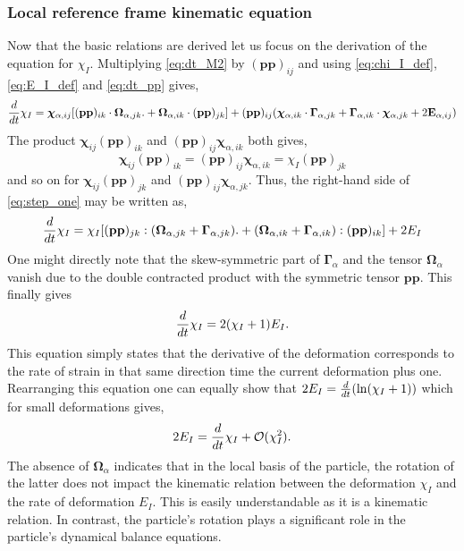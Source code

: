 \subsubsection{Local reference frame kinematic equation}

Now that the basic relations are derived let us focus on the derivation of the equation for $\chi_I$. 
Multiplying \ref{eq:dt_M2} by $(\textbf{pp})_{ij}$ and using \ref{eq:chi_I_def},\ref{eq:E_I_def} and  \ref{eq:dt_pp} gives, 
\begin{equation}
    \ddt \chi_I
    = 
    \bm\chi_{\alpha,ij} [(\textbf{pp})_{ik}\cdot\bm\Omega_{\alpha,jk}. 
    +\bm\Omega_{\alpha,ik}\cdot (\textbf{pp})_{jk}]
    + (\textbf{pp})_{ij}(\bm\chi_{\alpha,ik} \cdot \bm\Gamma_{\alpha,jk}
    + \bm\Gamma_{\alpha,ik} \cdot \bm\chi_{\alpha,jk}
    + 2\textbf{E}_{\alpha,ij})
    \label{eq:step_one}
\end{equation}
The product $\bm\chi_{ij} (\textbf{pp})_{ik}$ and $(\textbf{pp})_{ij}\bm\chi_{\alpha,ik}$ both gives, 
\begin{equation*}
    \bm\chi_{ij} (\textbf{pp})_{ik}
    =
    (\textbf{pp})_{ij}\bm\chi_{\alpha,ik}
    = 
    \chi_I (\textbf{pp})_{jk}
\end{equation*}
and so on for $\bm\chi_{ij} (\textbf{pp})_{jk}$ and $(\textbf{pp})_{ij} \bm\chi_{\alpha,jk}$. 
Thus, the right-hand side of \ref{eq:step_one} may be written as, 
\begin{equation}
    \ddt \chi_I
    = 
    \chi_I [(\textbf{pp})_{jk}:(\bm\Omega_{\alpha,jk} + \bm\Gamma_{\alpha,jk}). 
    +(\bm\Omega_{\alpha,ik} + \bm\Gamma_{\alpha,ik}) :(\textbf{pp})_{ik}]
    + 2E_I
    \label{eq:step_two}
\end{equation}
One might directly note that the skew-symmetric part of $\bm\Gamma_\alpha$ and the tensor $\bm\Omega_\alpha$ vanish due to the double contracted product with the symmetric tensor $\textbf{pp}$. 
This finally gives 
\begin{equation}
    \ddt \chi_I
    = 
    2(\chi_I +1)E_I. 
    \label{eq:dt_chi_I}
\end{equation}
This equation simply states that the derivative of the deformation corresponds to the rate of strain in that same direction time the current deformation plus one.  
Rearranging this equation one can equally show that $2E_I = \frac{d}{dt} (\ln(\chi_I+1))$ which for small deformations gives,
\begin{equation}
    2E_I =  \ddt \chi_I + \mathcal{O}(\chi_I^2). 
    \label{eq:small_def}
\end{equation}
The absence of $\bm\Omega_\alpha$ indicates that in the local basis of the particle, the rotation of the latter does not impact the kinematic relation between the deformation $\chi_I$ and the rate of deformation $E_I$.
This is easily understandable as it is a kinematic relation. 
In contrast, the particle's rotation plays a significant role in the particle's dynamical balance equations.


